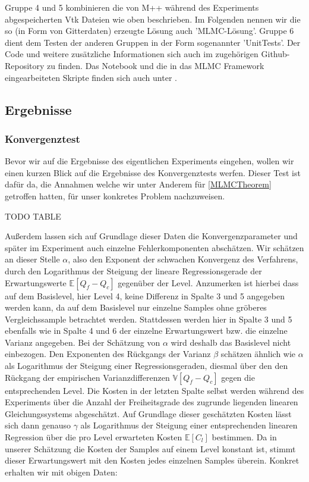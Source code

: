 Gruppe 4 und 5 kombinieren die von M++ während des Experiments abgespeicherten Vtk Dateien wie oben beschrieben. Im Folgenden nennen wir die so (in Form von Gitterdaten) erzeugte Lösung auch 'MLMC-Lösung'.
Gruppe 6 dient dem Testen der anderen Gruppen in der Form sogenannter 'UnitTests'.
Der Code und weitere zusätzliche Informationen sich auch im zugehörigen Github-Repository \cite{githubvtk} zu finden. Das Notebook und die in das MLMC Framework eingearbeiteten Skripte finden sich auch unter \cite{branchMLMCTP}.

\subsection{Ergebnisse}
\subsubsection{Konvergenztest}
Bevor wir auf die Ergebnisse des eigentlichen Experiments eingehen, wollen wir einen kurzen Blick auf die Ergebnisse des Konvergenztests werfen. Dieser Test ist dafür da, die Annahmen welche wir unter Anderem für \eqref{MLMCTheorem} getroffen hatten, für unser konkretes Problem nachzuweisen.

TODO TABLE


Außerdem lassen sich auf Grundlage dieser Daten die Konvergenzparameter und später im Experiment auch einzelne Fehlerkomponenten abschätzen. 
Wir schätzen an dieser Stelle $ \alpha $, also den Exponent der schwachen Konvergenz des Verfahrens, durch den Logarithmus der Steigung der lineare Regressionsgerade der Erwartungswerte $ \mathbb{E}[Q_f - Q_c] $ gegenüber der Level. Anzumerken ist hierbei dass auf dem Basislevel, hier Level 4, keine Differenz in Spalte 3 und 5 angegeben werden kann, da auf dem Basislevel nur einzelne Samples ohne gröberes Vergleichssample betrachtet werden. Stattdessen werden hier in Spalte 3 und 5 ebenfalls wie in Spalte 4 und 6 der einzelne Erwartungswert bzw. die einzelne Varianz angegeben. Bei der Schätzung von $ \alpha $ wird deshalb das Basislevel nicht einbezogen.
Den Exponenten des Rückgangs der Varianz $ \beta $ schätzen ähnlich wie $ \alpha $ als Logarithmus der Steigung einer Regressionsgeraden, diesmal über den den Rückgang der empirischen Varianzdifferenzen  $ \mathbb{V}[Q_f-Q_c] $ gegen die entsprechenden Level. Die Kosten in der letzten Spalte selbst werden während des Experiments über die Anzahl der Freiheitsgrade des zugrunde liegenden linearen Gleichungssystems abgeschätzt. 
Auf Grundlage dieser geschätzten Kosten lässt sich dann genauso $ \gamma $ als Logarithmus der Steigung einer entsprechenden linearen Regression über die pro Level erwarteten Kosten $ \mathbb{E}[C_l] $ bestimmen. Da in unserer Schätzung die Kosten der Samples auf einem Level konstant ist, stimmt dieser Erwartungswert mit den Kosten jedes einzelnen Samples überein.  
Konkret erhalten wir mit obigen Daten: 

